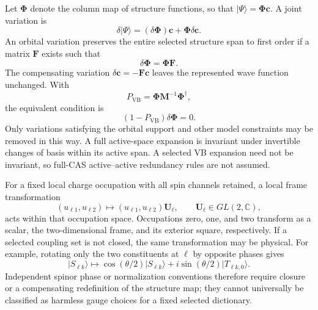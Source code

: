 \documentclass[12pt]{article}
\newcommand{\vb}{\mathrm{VB}}
\begin{document}
Let \(\boldsymbol\Phi\) denote the column map of structure functions, so that
\(|\Psi\rangle=\boldsymbol\Phi\mathbf c\). A joint variation is
\begin{equation}
 \delta|\Psi\rangle=(\delta\boldsymbol\Phi)\mathbf c
                    +\boldsymbol\Phi\delta\mathbf c.
 \label{eq:jointvariation}
\end{equation}
An orbital variation preserves the entire selected structure span to first order if a matrix \(\mathbf F\) exists such that
\begin{equation}
 \delta\boldsymbol\Phi=\boldsymbol\Phi\mathbf F.
 \label{eq:structuralgauge}
\end{equation}
The compensating variation \(\delta\mathbf c=-\mathbf F\mathbf c\) leaves the represented wave function unchanged. With
\begin{equation}
 P_{\vb}=\boldsymbol\Phi\mathbf M^{-1}\boldsymbol\Phi^\dagger,
 \label{eq:vbprojector}
\end{equation}
the equivalent condition is
\begin{equation}
 (1-P_{\vb})\delta\boldsymbol\Phi=0.
 \label{eq:gaugecriterion}
\end{equation}
Only variations satisfying the orbital support and other model constraints may be removed in this way. A full active-space expansion is invariant under invertible changes of basis within its active span. A selected VB expansion need not be invariant, so full-CAS active--active redundancy rules are not assumed.

For a fixed local charge occupation with all spin channels retained, a local frame transformation
\begin{equation}
 (u_{\ell1},u_{\ell2})\longmapsto
 (u_{\ell1},u_{\ell2})\mathbf U_\ell,
 \qquad \mathbf U_\ell\in GL(2,\mathbb C),
 \label{eq:localframe}
\end{equation}
acts within that occupation space. Occupations zero, one, and two transform as a scalar, the two-dimensional frame, and its exterior square, respectively. If a selected coupling set is not closed, the same transformation may be physical. For example, rotating only the two constituents at \(\ell\) by opposite phases gives
\begin{equation}
 |S_{\ell k}\rangle\longmapsto
 \cos(\theta/2)|S_{\ell k}\rangle
 +i\sin(\theta/2)|T_{\ell k,0}\rangle.
 \label{eq:phaseexample}
\end{equation}
Independent spinor phase or normalization conventions therefore require closure or a compensating redefinition of the structure map; they cannot universally be classified as harmless gauge choices for a fixed selected dictionary.
\end{document}
